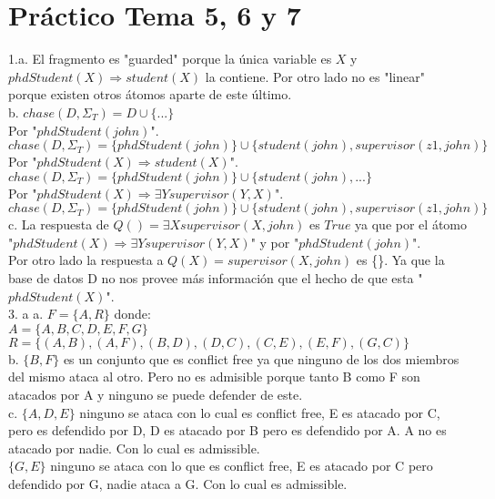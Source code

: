 \chapter{Práctico Tema 5, 6 y 7}

1.a. El fragmento es "guarded" porque la única variable es $X$ y $phdStudent(X) \Longrightarrow student(X)$ la contiene. Por otro lado no es "linear" porque existen otros átomos aparte de este último. \\

b. $chase(D, \Sigma_{T}) = D \cup \{...\}$ \\

Por "$phdStudent(john)$".\\

$chase(D, \Sigma_{T}) = \{phdStudent(john)\} \cup \{student(john), supervisor(z1, john) \}$ \\

Por "$phdStudent(X) \Longrightarrow student(X)$". \\

$chase(D, \Sigma_{T}) = \{phdStudent(john)\} \cup \{student(john), ...\}$\\

Por "$phdStudent(X) \Longrightarrow \exists Y supervisor(Y, X)$". \\

$chase(D, \Sigma_{T}) = \{phdStudent(john)\} \cup \{student(john), supervisor(z1, john) \}$ \\

c. La respuesta de $Q() = \exists X supervisor(X, john)$ es $True$ ya que por el átomo "$phdStudent(X) \Longrightarrow \exists Y supervisor(Y, X)$" y por "$phdStudent(john)$". \\

Por otro lado la respuesta a $Q(X) = supervisor(X, john)$ es \{\}. Ya que la base de datos D no nos provee más información que el hecho de que 
esta "$phdStudent(X)$". \\


3. a
a. $F=\{A, R\}$ donde: \\
$A=\{A, B, C, D, E, F, G\}$ \\
$R=\{(A, B), (A, F), (B, D), (D, C), (C, E), (E, F), (G, C)\}$ \\

b. $\{B, F\}$ es un conjunto que es conflict free ya que ninguno de los dos miembros del mismo ataca al otro. Pero no es admisible porque tanto B como F son atacados por A y ninguno se puede defender de este.\\

c. $\{A, D, E\}$ ninguno se ataca con lo cual es conflict free, E es atacado por C, pero es defendido por D, D es atacado por B pero es defendido por A. A no es atacado por nadie. Con lo cual es admissible. \\

$\{G, E\}$ ninguno se ataca con lo que es conflict free, E es atacado por C pero defendido por G, nadie ataca a G. Con lo cual es admissible.

\bigskip